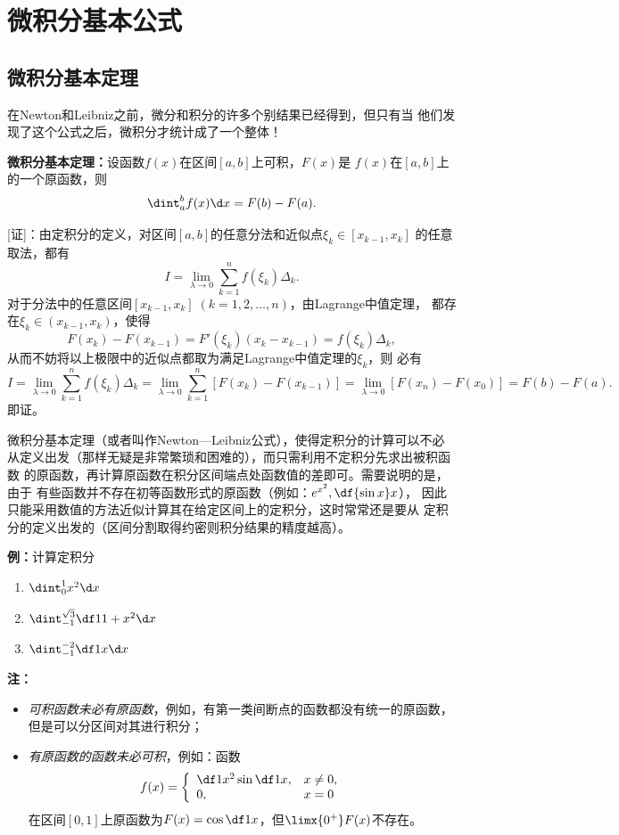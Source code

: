 \section{微积分基本公式}

\subsection{微积分基本定理}

在Newton和Leibniz之前，微分和积分的许多个别结果已经得到，但只有当
他们发现了这个公式之后，微积分才统计成了一个整体！

\begin{thx}
	{\bf 微积分基本定理：}设函数$f(x)$在区间$[a,b]$上可积，$F(x)$是
	$f(x)$在$[a,b]$上的一个原函数，则
	$$\dint_a^bf(x)\d x=F(b)-F(a).$$
\end{thx}

[证]：由定积分的定义，对区间$[a,b]$的任意分法和近似点$\xi_k\in[x_{k-1},x_k]$
的任意取法，都有
$$I=\lim\limits_{\lambda\to 0}\sum\limits_{k=1}^nf(\xi_k)\Delta_k.$$
对于分法中的任意区间$[x_{k-1},x_k]\;(k=1,2,\ldots,n)$，由Lagrange中值定理，
都存在$\xi_k\in(x_{k-1},x_k)$，使得
$$F(x_k)-F(x_{k-1})=F'(\xi_k)(x_k-x_{k-1})=f(\xi_k)\Delta_k,$$
从而不妨将以上极限中的近似点都取为满足Lagrange中值定理的$\xi_k$，则
必有
$$I=\lim\limits_{\lambda\to 0}\sum\limits_{k=1}^nf(\xi_k)\Delta_k
=\lim\limits_{\lambda\to 0}\sum\limits_{k=1}^n[F(x_k)-F(x_{k-1})]
=\lim\limits_{\lambda\to 0}[F(x_n)-F(x_0)]=F(b)-F(a).$$
即证。\fin

微积分基本定理（或者叫作Newton—Leibniz公式），使得定积分的计算可以不必
从定义出发（那样无疑是非常繁琐和困难的），而只需利用不定积分先求出被积函数
的原函数，再计算原函数在积分区间端点处函数值的差即可。需要说明的是，由于
有些函数并不存在初等函数形式的原函数（例如：$e^{x^2},\df{\sin x}x$），
因此只能采用数值的方法近似计算其在给定区间上的定积分，这时常常还是要从
定积分的定义出发的（区间分割取得约密则积分结果的精度越高）。

{\bf 例：}计算定积分
\begin{enumerate}[(1)]
  \setlength{\itemindent}{1cm}
  \item $\dint_{0}^{1}x^2 \d x$
  \item $\dint_{-1}^{\sqrt 3}\df 1{1+x^2}\d x$
  \item $\dint_{-1}^{-2}\df 1x\d x$
\end{enumerate}

{\bf 注：}
\begin{itemize}
  \setlength{\itemindent}{1cm}
  \item {\it 可积函数未必有原函数}，例如，有第一类间断点的函数都没有统一的原函数，
  但是可以分区间对其进行积分；
  \item {\it 有原函数的函数未必可积}，例如：函数
  $$f(x)=\left\{\begin{array}{ll}
  \df1{x^2}\sin\df1x,& x\ne0,\\ 0,& x=0
  \end{array}\right.$$
  在区间$[0,1]$上原函数为$F(x)=\cos\df1x$，但$\limx{0^+}F(x)$不存在。
\end{itemize}

